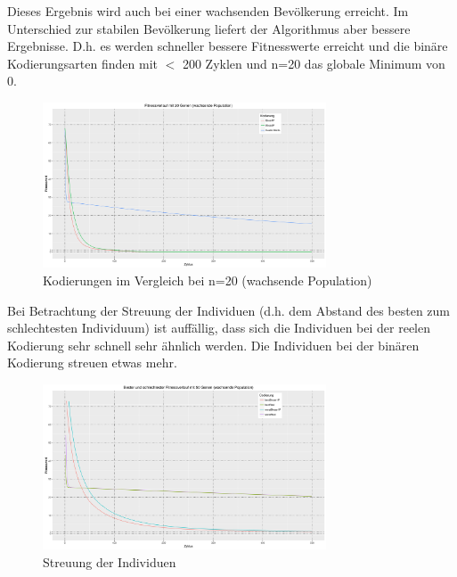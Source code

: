 \documentclass[12pt,
    a4paper,
    headinclude,
    footinclude]{scrreprt}
\begin{document}
Dieses Ergebnis wird auch bei einer wachsenden Bevölkerung erreicht. Im Unterschied zur stabilen Bevölkerung liefert der Algorithmus aber bessere Ergebnisse. D.h. es werden schneller bessere Fitnesswerte erreicht und die binäre Kodierungsarten finden mit $<$ 200 Zyklen und n=20 das globale Minimum von 0.
	\begin{figure}[H]
	\includegraphics[width=0.75\textwidth]{../best-20-grow.jpeg} 
	
	\caption*{Kodierungen im Vergleich bei n=20 (wachsende Population)} 
	\label{InputOutput}
\end{figure}


Bei Betrachtung der Streuung der Individuen (d.h. dem Abstand des besten zum schlechtesten Individuum) ist auffällig, dass sich die Individuen bei der reelen Kodierung sehr schnell sehr ähnlich werden. Die Individuen bei der binären Kodierung streuen etwas mehr.
		\begin{figure}[H]
		\includegraphics[width=0.75\textwidth]{../best-and-worst.jpeg} 
		
		\caption*{Streuung der Individuen} 
		\label{InputOutput}
	\end{figure}


	
	

	

	
	
\end{document}
